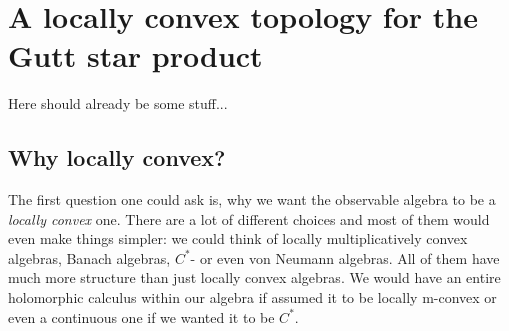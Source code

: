 
%
%

\chapter{A locally convex topology for the Gutt star product}

Here should already be some stuff...

\section{Why locally convex?}
\label{sec:chap5_Prelim}

The first question one could ask is, why we want the observable algebra 
to be a \textit{locally convex} one. There are a lot of different choices 
and most of them would even make things simpler: we could think of 
locally multiplicatively convex algebras, Banach algebras, $C^*$- or even 
von Neumann algebras. All of them have much more structure than just 
locally convex algebras. We would have an entire holomorphic calculus 
within our algebra if assumed it to be locally m-convex or even a 
continuous one if we wanted it to be $C^*$.


